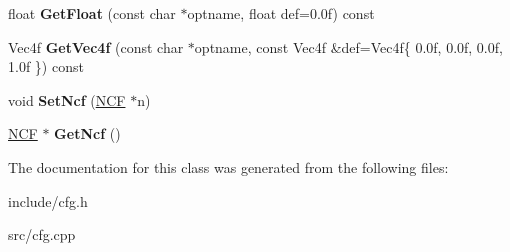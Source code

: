 \begin{DoxyCompactItemize}
\mbox{\label{class_blade_1_1_config_file_a64a881ca86d9656dc5828f3bbf5f648e}} 
float {\bfseries Get\+Float} (const char $\ast$optname, float def=0.\+0f) const
\item 
\mbox{\label{class_blade_1_1_config_file_aeb60c5a14c306d4099bbac38d3252197}} 
Vec4f {\bfseries Get\+Vec4f} (const char $\ast$optname, const Vec4f \&def=Vec4f\{ 0.\+0f, 0.\+0f, 0.\+0f, 1.\+0f \}) const
\item 
\mbox{\label{class_blade_1_1_config_file_ad818a9b7355c26582bc1e2448795eef5}} 
void {\bfseries Set\+Ncf} (\hyperlink{class_blade_1_1_n_c_f}{N\+CF} $\ast$n)
\item 
\mbox{\label{class_blade_1_1_config_file_abd5103b4b9bc45da033217b8d78fd1c1}} 
\hyperlink{class_blade_1_1_n_c_f}{N\+CF} $\ast$ {\bfseries Get\+Ncf} ()
\end{DoxyCompactItemize}


The documentation for this class was generated from the following files\+:\begin{DoxyCompactItemize}
\item 
include/cfg.\+h\item 
src/cfg.\+cpp\end{DoxyCompactItemize}
